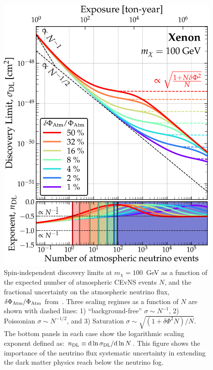 \begin{figure}[!htbp]
\begin{center}
\includegraphics[width=0.98\columnwidth]{fig_nufloor_100GeV.pdf}
\caption{Spin-independent discovery limits at $m_\chi = 100$~GeV as a function of the expected number of atmospheric CEvNS events $N$, and the fractional uncertainty on the atmospheric neutrino flux, $\delta \Phi_{\rm Atm}/\Phi_{\rm Atm}$ from~\cite{OHare:2016pjy}. Three scaling regimes as a function of $N$ are shown with dashed lines: 1) ``background-free'' $\sigma \sim N^{-1}$, 2) Poissonian $\sigma \sim N^{-1/2}$, and 3) Saturation $\sigma \sim \sqrt{(1+\delta\Phi^2 N)/N}$. The bottom panels in each case show the logarithmic scaling exponent defined as: $n_{\rm DL} \equiv \textrm{d} \ln\sigma_{\rm DL}/\textrm{d} \ln N$. This figure shows the importance of the neutrino flux systematic uncertainty in extending the dark matter physics reach below the neutrino fog.}
\label{fig:fig_nufloor_100GeV}
\end{center} 
\end{figure}

